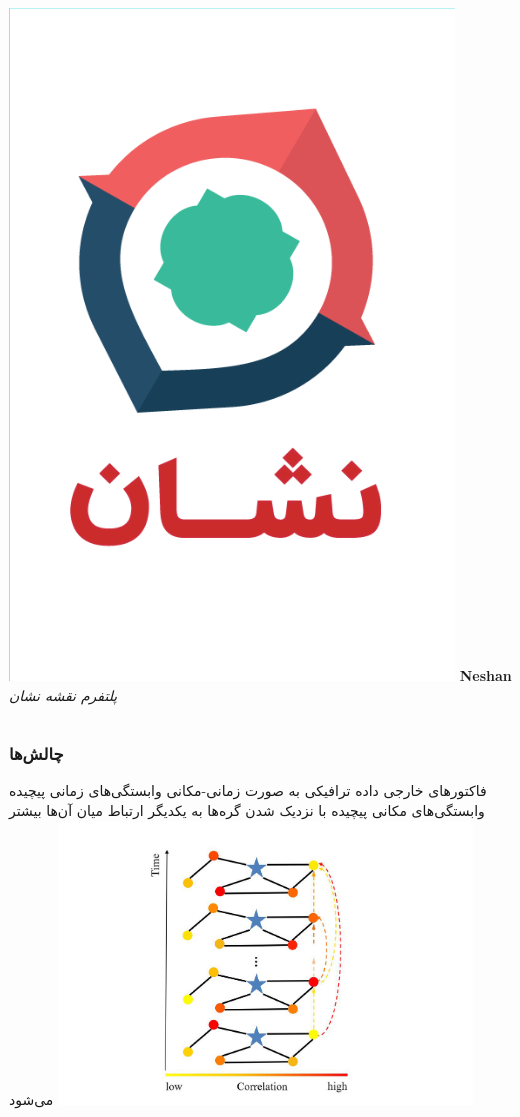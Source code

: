 \documentclass{beamer}
\begin{document}
\begin{frame}
\begin{columns}
    \includegraphics[height=0.5\textheight]{./img/neshan.png}
    \textbf{Neshan}\\
    \textit{پلتفرم نقشه نشان}
  \end{columns}
\end{frame}

\begin{frame}
  \frametitle{چالش‌ها\cite{2004.08555}}
   فاکتورهای خارجی
   داده ترافیکی به صورت زمانی-مکانی
   وابستگی‌های زمانی پیچیده
   وابستگی‌های مکانی پیچیده
   با نزدیک شدن گره‌ها به یکدیگر ارتباط میان آن‌ها بیشتر می‌شود
  \centering
  \includegraphics[height=0.5\textheight]{./img/correlations.png}
\end{frame}
\end{document}
